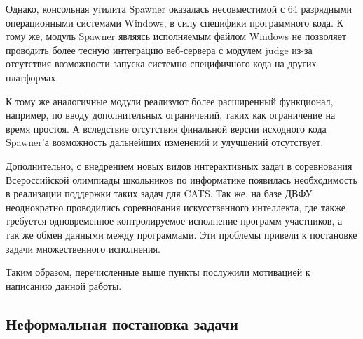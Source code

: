 \documentclass{imcs}
\begin{document}
Однако, консольная утилита Spawner оказалась несовместимой с 64 разрядными операционными системами Windows, в силу специфики программного кода. К тому же, модуль Spawner являясь исполняемым файлом Windows не позволяет проводить более тесную интеграцию веб-сервера с модулем judge из-за отсутствия возможности запуска системно-специфичного кода на других платформах.

К тому же аналогичные модули реализуют более расширенный функционал, например, по вводу дополнительных ограничений, таких как ограничение на время простоя. А вследствие отсутствия финальной версии исходного кода Spawner'а возможность дальнейших изменений и улучшений отсутствует.

Дополнительно, с внедрением новых видов интерактивных задач в соревнования Всероссийской олимпиады школьников по информатике\cite{vseros} появилась необходимость в реализации поддержки таких задач для CATS.
Так же, на базе ДВФУ неоднократно проводились соревнования искусственного интеллекта, где также требуется одновременное контролируемое исполнение программ участников, а так же обмен данными между программами. Эти проблемы привели к постановке задачи множественного исполнения. 

Таким образом, перечисленные выше пункты послужили мотивацией к написанию данной работы.

\subsection{Неформальная постановка задачи}
\end{document}
